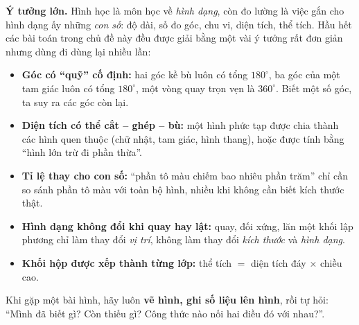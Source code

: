 \ifdefined\gmFig\else
\newenvironment{gmFig}[1][]{\par\vspace{2pt}\begin{center}\begin{tikzpicture}[font=\sffamily\small,>=stealth,line join=round,#1]}%
  {\end{tikzpicture}\end{center}\vspace{1pt}}
\fi
\providecommand{\gmCube}[3]{%
  \begin{scope}[shift={(#1,0)},x=1.05cm,y=1.05cm]
    \fill[white] (0,0) rectangle (1,1);
    #3
    \draw[Ink,line width=0.8pt] (0,0) rectangle (1,1);
    \draw[Ink,line width=0.8pt] (0,1)--(0.4,1.25)--(1.4,1.25)--(1.4,0.25)--(1,0);
    \draw[Ink,line width=0.8pt] (1,1)--(1.4,1.25);
    \node[font=\small\bfseries,anchor=east] at (-0.05,1.1) {#2};
  \end{scope}}

\begin{knowbox}
\textbf{Ý tưởng lớn.} Hình học là môn học về \emph{hình dạng}, còn đo lường là việc gắn cho hình dạng ấy những \emph{con số}: độ dài, số đo góc, chu vi, diện tích, thể tích. Hầu hết các bài toán trong chủ đề này đều được giải bằng một vài ý tưởng rất đơn giản nhưng dùng đi dùng lại nhiều lần:
\begin{itemize}[leftmargin=1.3em,itemsep=1pt,topsep=2pt]
  \item \textbf{Góc có ``quỹ'' cố định:} hai góc kề bù luôn có tổng $180^\circ$, ba góc của một tam giác luôn có tổng $180^\circ$, một vòng quay trọn vẹn là $360^\circ$. Biết một số góc, ta suy ra các góc còn lại.
  \item \textbf{Diện tích có thể cắt -- ghép -- bù:} một hình phức tạp được chia thành các hình quen thuộc (chữ nhật, tam giác, hình thang), hoặc được tính bằng ``hình lớn trừ đi phần thừa''.
  \item \textbf{Tỉ lệ thay cho con số:} ``phần tô màu chiếm bao nhiêu phần trăm'' chỉ cần so sánh phần tô màu với toàn bộ hình, nhiều khi không cần biết kích thước thật.
  \item \textbf{Hình dạng không đổi khi quay hay lật:} quay, đối xứng, lăn một khối lập phương chỉ làm thay đổi \emph{vị trí}, không làm thay đổi \emph{kích thước} và \emph{hình dạng}.
  \item \textbf{Khối hộp được xếp thành từng lớp:} thể tích $=$ diện tích đáy $\times$ chiều cao.
\end{itemize}
Khi gặp một bài hình, hãy luôn \textbf{vẽ hình, ghi số liệu lên hình}, rồi tự hỏi: ``Mình đã biết gì? Còn thiếu gì? Công thức nào nối hai điều đó với nhau?''.
\end{knowbox}
\vspace{0.3cm}

